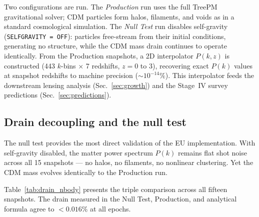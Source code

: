 \documentclass[a4paper,fleqn]{cas-dc}
\begin{document}
Two configurations are run. The \textit{Production} run
uses the full TreePM gravitational solver; CDM particles
form halos, filaments, and voids as in a standard
cosmological simulation. The \textit{Null Test} run
disables self-gravity (\texttt{SELFGRAVITY = OFF}):
particles free-stream from their initial conditions,
generating no structure, while the CDM mass drain
continues to operate identically. From the Production
snapshots, a 2D interpolator $P(k, z)$ is constructed
(443 $k$-bins $\times$ 7 redshifts, $z = 0$ to $3$),
recovering exact $P(k)$ values at snapshot redshifts
to machine precision ($\sim\!10^{-14}\%$). This
interpolator feeds the downstream lensing analysis
(Sec.~\ref{sec:growth}) and the Stage~IV survey
predictions (Sec.~\ref{sec:predictions}).

\subsection{Drain decoupling and the null test}
\label{sec:null_test}

The null test provides the most direct validation of the EU
implementation. With self-gravity disabled, the matter power
spectrum $P(k)$ remains flat shot noise across all 15
snapshots --- no halos, no filaments, no nonlinear
clustering. Yet the CDM mass evolves identically to the
Production run.

Table~\ref{tab:drain_nbody} presents the triple comparison
across all fifteen snapshots. The drain measured in the
Null Test, Production, and analytical formula agree to
$< 0.016\%$ at all epochs.
\end{document}
